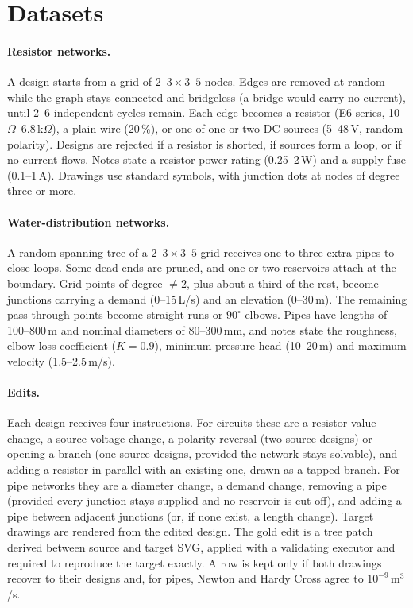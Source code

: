 \section{Datasets}
\label{sec:data}

\paragraph{Resistor networks.} A design starts from a grid of $2$--$3 \times 3$--$5$ nodes. Edges are removed
at random while the graph stays connected and bridgeless (a bridge would carry no current), until $2$--$6$
independent cycles remain. Each edge becomes a resistor (E6 series, 10\,$\Omega$--6.8\,k$\Omega$), a plain wire
(20\,\%), or one of one or two DC sources (5--48\,V, random polarity). Designs are rejected if a resistor is
shorted, if sources form a loop, or if no current flows. Notes state a resistor power rating (0.25--2\,W) and a
supply fuse (0.1--1\,A). Drawings use standard symbols, with junction dots at nodes of degree three or more.

\paragraph{Water-distribution networks.} A random spanning tree of a $2$--$3 \times 3$--$5$ grid receives one to
three extra pipes to close loops. Some dead ends are pruned, and one or two reservoirs attach at the boundary.
Grid points of degree $\neq 2$, plus about a third of the rest, become junctions carrying a demand
(0--15\,L/s) and an elevation (0--30\,m). The remaining pass-through points become straight runs or
$90^\circ$ elbows. Pipes have lengths of 100--800\,m and nominal diameters of 80--300\,mm, and notes state the
roughness, elbow loss coefficient ($K=0.9$), minimum pressure head (10--20\,m) and maximum velocity
(1.5--2.5\,m/s).

\paragraph{Edits.} Each design receives four instructions. For circuits these are a resistor value change, a
source voltage change, a polarity reversal (two-source designs) or opening a branch (one-source designs,
provided the network stays solvable), and adding a resistor in parallel with an existing one, drawn as a
tapped branch. For pipe networks they are a diameter change, a demand change, removing a pipe (provided every
junction stays supplied and no reservoir is cut off), and adding a pipe between adjacent junctions (or, if
none exist, a length change). Target drawings are rendered from the edited design. The gold edit is a tree patch
derived between source and target SVG, applied with a validating executor and required to reproduce the
target exactly. A row is kept only if both drawings recover to their designs and, for pipes, Newton and Hardy
Cross agree to $10^{-9}$\,m$^3$/s.

